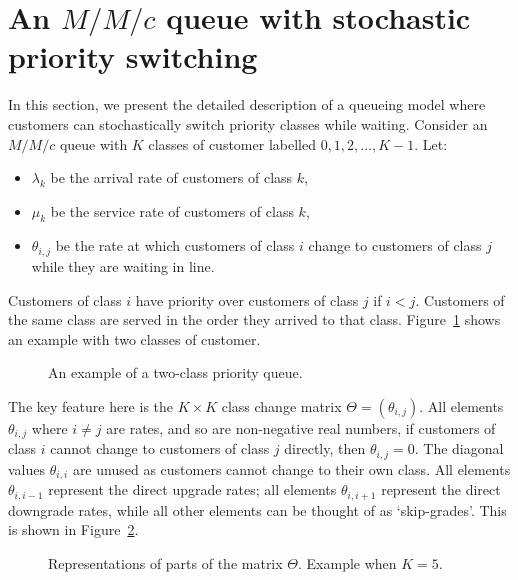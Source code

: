 \documentclass{article}
\begin{document}
\section{An $M/M/c$ queue with stochastic priority switching}\label{sec:system}
In this section, we present the detailed description of a queueing model where
customers can stochastically switch priority classes while waiting.
Consider an $M/M/c$ queue with $K$ classes of customer labelled
$0, 1, 2, \dots, K-1$. Let:

\begin{itemize}
  \item $\lambda_k$ be the arrival rate of customers of class $k$,
  \item $\mu_k$ be the service rate of customers of class $k$,
  \item $\theta_{i,j}$ be the rate at which customers of class $i$ change
  to customers of class $j$ while they are waiting in line.
\end{itemize}

Customers of class $i$ have priority over customers of class $j$ if $i < j$.
Customers of the same class are served in the order they arrived to that class.
Figure~\ref{fig:twoclass_example} shows an example with two classes of customer.

\begin{figure}
\begin{center}

\end{center}
\caption{An example of a two-class priority queue.}
\label{fig:twoclass_example}
\end{figure}

The key feature here is the $K \times K$ class change matrix
$\Theta = (\theta_{i,j})$. All elements $\theta_{i,j}$ where $i \neq j$ are
rates, and so are non-negative real numbers, if customers of class $i$ cannot
change to customers of class $j$ directly, then $\theta_{i,j} = 0$. The diagonal
values $\theta_{i,i}$ are unused as customers cannot change to their own class.
All elements $\theta_{i,i-1}$ represent the direct upgrade rates; all elements
$\theta_{i,i+1}$ represent the direct downgrade rates, while all other elements
can be thought of as `skip-grades'.
This is shown in Figure~\ref{fig:skipgrades}.

\begin{figure}
\begin{center}

\end{center}
\caption{Representations of parts of the matrix $\Theta$. Example when $K=5$.}
\label{fig:skipgrades}
\end{figure}
\end{document}
